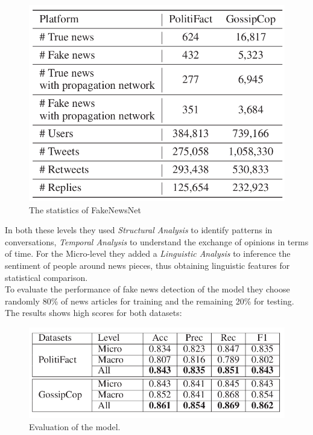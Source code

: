 \documentclass[conference]{IEEEtran}
\begin{document}
\begin{appendices}
\begin{figure}[htp]
	\centering
	\includegraphics[scale=0.3]{fake_news_net_content.png}
	\caption{The statistics of FakeNewsNet}
\end{figure}




In both these levels they used \textit{Structural Analysis} to identify patterns in conversations, \textit{Temporal Analysis} to understand the exchange of opinions in terms of time. For the Micro-level they added a \textit{Linguistic Analysis} to inference the sentiment of people around news pieces, thus obtaining linguistic features for statistical comparison.\\

To evaluate the performance of fake news detection of the model they choose randomly 80\% of news articles for training and the remaining 20\% for testing. The results shows high scores for both datasets:

\begin{figure}[htp]
	\centering
	\includegraphics[scale=0.4]{hierarchical_evaluation_results.png}
	\caption{Evaluation of the model. \cite{shu2020hierarchical}}
\end{figure}


\end{appendices}
\end{document}
